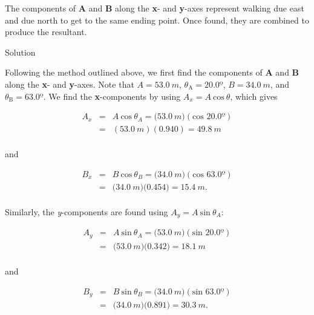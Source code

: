 \documentclass[
]{book}
\newenvironment{tinysection}{}{}
\begin{document}
The components of \(\mathbf{A}{}\) and \(\mathbf{B}{}\) along the \textbf{x}- and
\textbf{y}-axes represent walking due east and due north to get to the same
ending point. Once found, they are combined to produce the resultant.

\begin{tinysection}

{Solution}

\end{tinysection}

Following the method outlined above, we first find the components of
\(\mathbf{A}{}\) and \(\mathbf{B}{}\) along the \textbf{x}- and \textbf{y}-axes. Note
that \(A = 53.0\ m\), \(\theta_{\text{A}} = 20.0º\), \(B = 34.0\ m\), and
\({\theta_{\text{B}} = 63.0º}{}\). We find the \textbf{x}-components by using
\({{A_{x} = A}\ \text{cos}\ \theta}{}\), which gives

\leavevmode\hypertarget{eip-253}{}%
\[\begin{array}{lll}
A_{x} & = & {A\ \text{cos}\ {\theta_{A} = (}\text{53.}0\ m)(\text{cos\ 20.0º})} \\
 & = & {(\text{53.}0\ m)(0\text{.940}) = \text{49.}8\ m} \\
\end{array}\]

and

\leavevmode\hypertarget{eip-356}{}%
\[\begin{array}{lll}
B_{x} & = & {B\ \text{cos}\ {\theta_{B} = (}\text{34}\text{.}0\ m)(\text{cos\ 63.0º})} \\
 & = & {{(}\text{34}\text{.}0\ m)(0\text{.}\text{454}{) = \text{15}}\text{.}4\ m\text{.}} \\
\end{array}{}\]

Similarly, the \emph{y}-components are found using
\({{A_{y} = A}\ \text{sin}\ \theta_{A}}{}\):

\leavevmode\hypertarget{eip-802}{}%
\[\begin{array}{lll}
A_{y} & = & {A\ \text{sin}{\ \theta_{A} = (}\text{53}\text{.}0\ m)(\text{sin\ 20.0º})} \\
 & = & {{(}\text{53}\text{.}0\ m)(0\text{.}\text{342}{) = \text{18}}\text{.}1\ m} \\
\end{array}{}\]

and

\leavevmode\hypertarget{eip-837}{}%
\[\begin{array}{lll}
B_{y} & = & {B\ \text{sin}\ {\theta_{B} = (}\text{34}\text{.}0\ m)(\text{sin\ 63}\text{.}0º)} \\
 & = & {{(}\text{34}\text{.}0\ m)(0\text{.}\text{891}{) = \text{30}}\text{.}3\ m\text{.}} \\
\end{array}{}\]
\end{document}
